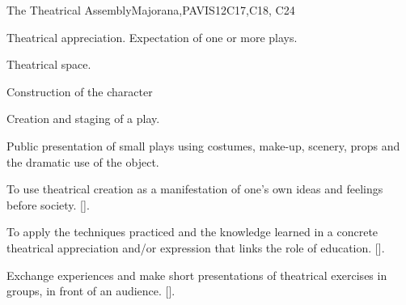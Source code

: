 \begin{syllabus}
\begin{unit}{}{The Theatrical Assembly}{Majorana,PAVIS}{12}{C17,C18, C24}
\begin{topics}
	\item Theatrical appreciation. Expectation of one or more plays.
	\item Theatrical space.
	\item Construction of the character
	\item Creation and staging of a play.
	\item Public presentation of small plays using costumes, make-up, scenery, props and the dramatic use of the object.
\end{topics}
\begin{learningoutcomes}
	\item To use theatrical creation as a manifestation of one's own ideas and feelings before society. [\Usage].
	\item To apply the techniques practiced and the knowledge learned in a concrete theatrical appreciation and/or expression that links the role of education. [\Usage].
	\item Exchange experiences and make short presentations of theatrical exercises in groups, in front of an audience. [\Usage].
\end{learningoutcomes}
\end{unit}

\begin{coursebibliography}
\end{coursebibliography}

\end{syllabus}
